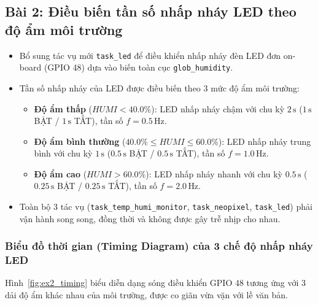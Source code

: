 \subsection{Bài 2: Điều biến tần số nhấp nháy LED theo độ ẩm môi trường}

\begin{tcolorbox}[
    enhanced, colback=black!2, colframe=black!60, boxrule=1pt, arc=2.5mm, drop shadow,
    attach boxed title to top left={xshift=4mm, yshift=-3mm},
    boxed title style={enhanced, colback=black!85, colframe=black!85, boxrule=1pt, arc=2.5mm, drop shadow, left=6pt, right=6pt, top=2pt, bottom=2pt},
    title=\textcolor{white}{\large\textbf{Yêu cầu đề bài (Trích phiếu bài tập)}}
]
\bfseries
\vspace{0.2cm}
\begin{itemize}
    \item Bổ sung tác vụ mới \texttt{task\_led} để điều khiển nhấp nháy đèn LED đơn on-board (GPIO 48) dựa vào biến toàn cục \texttt{glob\_humidity}.
    \item Tần số nhấp nháy của LED được điều biến theo 3 mức độ ẩm môi trường:
    \begin{itemize}
        \item \textbf{Độ ẩm thấp} ($HUMI < 40.0\%$): LED nhấp nháy chậm với chu kỳ $2\,\text{s}$ ($1\,\text{s}$ BẬT / $1\,\text{s}$ TẮT), tần số $f = 0.5\,\text{Hz}$.
        \item \textbf{Độ ẩm bình thường} ($40.0\% \le HUMI \le 60.0\%$): LED nhấp nháy trung bình với chu kỳ $1\,\text{s}$ ($0.5\,\text{s}$ BẬT / $0.5\,\text{s}$ TẮT), tần số $f = 1.0\,\text{Hz}$.
        \item \textbf{Độ ẩm cao} ($HUMI > 60.0\%$): LED nhấp nháy nhanh với chu kỳ $0.5\,\text{s}$ ($0.25\,\text{s}$ BẬT / $0.25\,\text{s}$ TẮT), tần số $f = 2.0\,\text{Hz}$.
    \end{itemize}
    \item Toàn bộ 3 tác vụ (\texttt{task\_temp\_humi\_monitor}, \texttt{task\_neopixel}, \texttt{task\_led}) phải vận hành song song, đồng thời và không được gây trễ nhịp cho nhau.
\end{itemize}
\end{tcolorbox}

\vspace{0.2cm}
\subsubsection{Biểu đồ thời gian (Timing Diagram) của 3 chế độ nhấp nháy LED}
Hình~\ref{fig:ex2_timing} biểu diễn dạng sóng điều khiển GPIO 48 tương ứng với 3 dải độ ẩm khác nhau của môi trường, được co giãn vừa vặn với lề văn bản.

